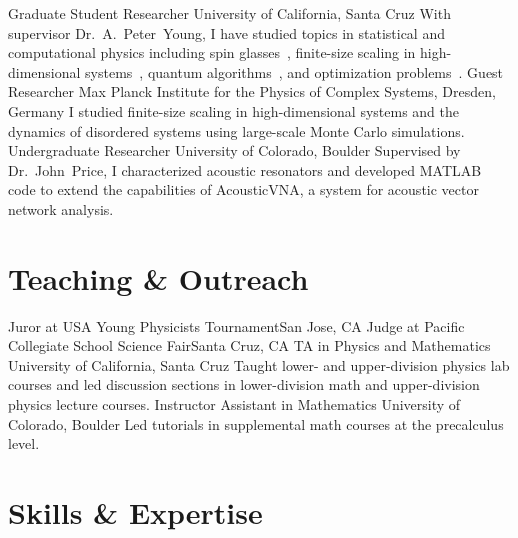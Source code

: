\documentclass{cv}
\def\Peter{Dr.~A.~Peter~Young}
\def\John{Dr.~John~Price}
\begin{document}
\begin{cvjobs}
    {Graduate Student Researcher}
    {University of California, Santa Cruz}
    {With supervisor \Peter, I have studied topics in statistical and
     computational physics including
     spin glasses~\cite{wittmann2015connection,wittmann2014low,wittmann2012spin,wittmann2013low},
     finite-size scaling in high-dimensional systems~\cite{wittmann2014finite},
     quantum algorithms~\cite{wittmann2014distinguishing,wittmann2014scheduling},
     and optimization problems~\cite{wittmann2014scheduling}.}
    {Guest Researcher}
    {Max Planck Institute for the Physics of Complex Systems, Dresden, Germany}
    {I studied finite-size scaling in high-dimensional systems and the
     dynamics of disordered systems using large-scale Monte Carlo simulations.}
    {Undergraduate Researcher}
    {University of Colorado, Boulder}
    {Supervised by \John{}, I characterized acoustic resonators and developed
     MATLAB code to extend the capabilities of AcousticVNA, a system for acoustic
     vector network analysis.}
\end{cvjobs}

\section{Teaching \& Outreach}

\begin{cvjobs}
    {Juror at USA Young Physicists Tournament}{San Jose, CA}{}
  \cvjob{}{}
    {Judge at Pacific Collegiate School Science Fair}{Santa Cruz, CA}{}
    {TA in Physics and Mathematics}
    {University of California, Santa Cruz}
    {Taught lower- and upper-division physics lab courses and led discussion sections in
     lower-division math and upper-division physics lecture courses.}
    {Instructor Assistant in Mathematics}
    {University of Colorado, Boulder}
    {Led tutorials in supplemental math courses at the precalculus level.}
\end{cvjobs}

\section{Skills \& Expertise}
\end{document}
